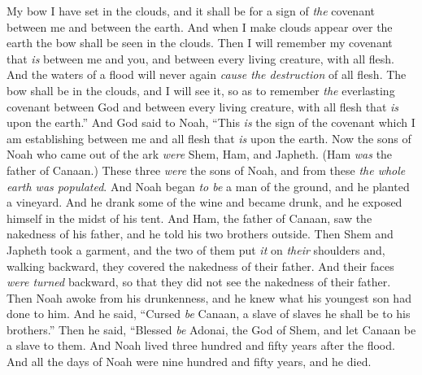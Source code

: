 \begin{biblechapter}
\verse My bow I have set in the clouds, and it shall be for a sign of \textit{the} covenant between me and between the earth.
\verse And when I make clouds appear over the earth the bow shall be seen in the clouds.
\verse Then I will remember my covenant that \textit{is} between me and you, and between every living creature, with all flesh. And the waters of a flood will never again \textit{cause the destruction} of all flesh.
\verse The bow shall be in the clouds, and I will see it, so as to remember \textit{the} everlasting covenant between God and between every living creature, with all flesh that \textit{is} upon the earth.”
\verse And God said to Noah, “This \textit{is} the sign of the covenant which I am establishing between me and all flesh that \textit{is} upon the earth.
 Now the sons of Noah who came out of the ark \textit{were} Shem, Ham, and Japheth. (Ham \textit{was} the father of Canaan.)
\verse These three \textit{were} the sons of Noah, and from these \textit{the whole earth was populated}.
\verse And Noah began \textit{to be} a man of the ground, and he planted a vineyard.
\verse And he drank some of the wine and became drunk, and he exposed himself in the midst of his tent.
\verse And Ham, the father of Canaan, saw the nakedness of his father, and he told his two brothers outside.
\verse Then Shem and Japheth took a garment, and the two of them put \textit{it} on \textit{their} shoulders and, walking backward, they covered the nakedness of their father. And their faces \textit{were turned} backward, so that they did not see the nakedness of their father.
\verse Then Noah awoke from his drunkenness, and he knew what his youngest son had done to him.
\verse And he said, “Cursed \textit{be} Canaan, 
a slave of slaves he shall be to his brothers.”
\verse Then he said,
\verse “Blessed \textit{be} Adonai, the God of Shem, 
and let Canaan be a slave to them.
\verse And Noah lived three hundred and fifty years after the flood.
\verse And all the days of Noah were nine hundred and fifty years, and he died.
\end{biblechapter}

